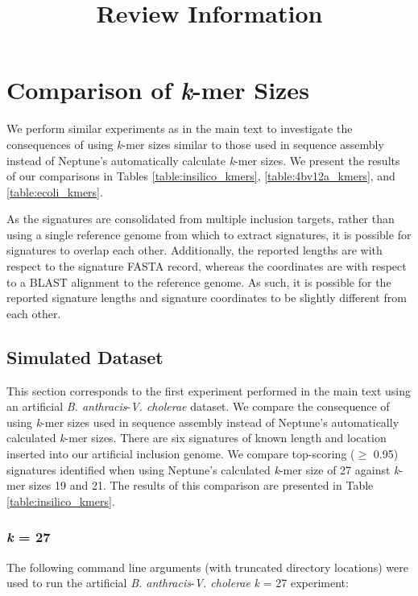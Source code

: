 \documentclass[a4paper,10pt]{article}
\title{Review Information}
\begin{document}
\date{}
\maketitle
\tableofcontents

\newpage
\section{Comparison of \textit{k}-mer Sizes}

We perform similar experiments as in the main text to investigate the consequences of using \textit{k}-mer sizes similar to those used in sequence assembly instead of Neptune's automatically calculate \textit{k}-mer sizes. We present the results of our comparisons in Tables \ref{table:insilico_kmers}, \ref{table:4bv12a_kmers}, and \ref{table:ecoli_kmers}.

As the signatures are consolidated from multiple inclusion targets, rather than using a single reference genome from which to extract signatures, it is possible for signatures to overlap each other. Additionally, the reported lengths are with respect to the signature FASTA record, whereas the coordinates are with respect to a BLAST alignment to the reference genome. As such, it is possible for the reported signature lengths and signature coordinates to be slightly different from each other.

\subsection{Simulated Dataset}

This section corresponds to the first experiment performed in the main text using an artificial \textit{B. anthracis}-\textit{V. cholerae} dataset. We compare the consequence of using \textit{k}-mer sizes used in sequence assembly instead of Neptune's automatically calculated \textit{k}-mer sizes. There are six signatures of known length and location inserted into our artificial inclusion genome. We compare top-scoring (\(\geq\) 0.95) signatures identified when using Neptune's calculated \textit{k}-mer size of 27 against \textit{k}-mer sizes 19 and 21. The results of this comparison are presented in Table \ref{table:insilico_kmers}.

\subsubsection*{\textit{k} = 27}

The following command line arguments (with truncated directory locations) were used to run the artificial \textit{B. anthracis}-\textit{V. cholerae} \textit{k} = 27 experiment:
\end{document}
